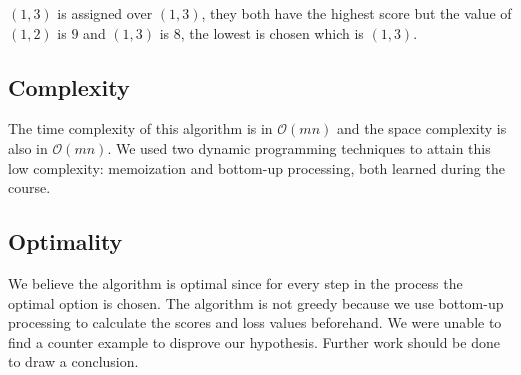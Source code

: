 \documentclass[paper=a4, fontsize=11pt]{scrartcl} %
\numberwithin{equation}{section} %
\numberwithin{figure}{section} %
\numberwithin{table}{section} %
\begin{document}
$(1,3)$ is assigned over $(1,3)$, they both have the highest score but the value of $(1,2)$ is $9$ and $(1,3)$ is $8$, the lowest is chosen which is $(1,3)$. 


\subsection{Complexity}

The time complexity of this algorithm is in $\mathcal{O}(mn)$ and the space complexity is also in $\mathcal{O}(mn)$.
We used two dynamic programming techniques to attain this low complexity: memoization and bottom-up processing, both learned during the course.

\subsection{Optimality}
We believe the algorithm is optimal since for every step in the process the optimal option is chosen.
The algorithm is not greedy because we use bottom-up processing to calculate the scores and loss values beforehand.
We were unable to find a counter example to disprove our hypothesis.
Further work should be done to draw a conclusion.
\end{document}
